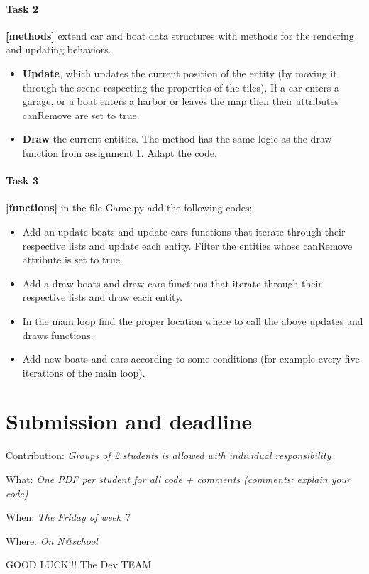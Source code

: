 \documentclass[10pt,a4paper]{article}
\begin{document}
\paragraph{Task 2} \textbf{[methods]} extend car and boat data structures with methods for the rendering and updating behaviors.   
\begin{itemize}[noitemsep,nolistsep]
	\item \textbf{Update}, which updates the current position of the entity (by moving it through the scene respecting the properties of the tiles). If a car enters a garage, or a boat enters a harbor or leaves the map then their attributes canRemove are set to true. 
	\item \textbf{Draw} the current entities. The method has the same logic as the draw function from assignment 1. Adapt the code.  
\end{itemize}

\paragraph{Task 3} \textbf{[functions]} in the file Game.py add the following codes:
  \begin{itemize}
  	\item Add an update boats and update cars functions that iterate through their respective lists and update each entity. Filter the entities whose canRemove attribute is set to true.
  	\item Add a draw boats and draw cars functions that iterate through their respective lists and draw each entity.
  	\item In the main loop find the proper location where to call the above updates and draws functions.
  	\item Add new boats and cars according to some conditions (for example every five iterations of the main loop).
  \end{itemize}

\section{Submission and deadline}

\noindent
Contribution: \textit{Groups of 2 students is allowed with individual responsibility}

\noindent
What: \textit{One PDF per student for all code + comments (comments: explain your code)}

\noindent
When: \textit{The Friday of week 7}

\noindent
Where: \textit{On N@school}


\huge
\centering
GOOD LUCK!!! The Dev TEAM \smiley

	
\end{document}
